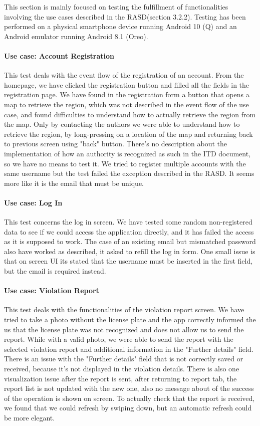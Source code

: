This section is mainly focused on testing the fulfillment of functionalities involving the use cases described in the RASD(section 3.2.2). Testing has been performed on a physical smartphone device running Android 10 (Q) and an Android emulator running Android 8.1 (Oreo).

\paragraph{Use case: Account Registration}
This test deals with the event flow of the registration of an account. From the homepage, we have clicked the registration button and filled all the fields in the registration page. We have found in the registration form a button that opens a map to retrieve the region, which was not described in the event flow of the use case, and found difficulties to understand how to actually retrieve the region from the map. Only by contacting the authors we were able to understand how to retrieve the region, by long-pressing on a location of the map and returning back to previous screen using "back" button. There's no description about the implementation of how an authority is recognized as such in the ITD document, so we have no means to test it. We tried to register multiple accounts with the same username but the test failed the exception described in the RASD. It seems more like it is the email that must be unique.
\paragraph{Use case: Log In} 
This test concerns the log in screen. We have tested some random non-registered data to see if we could access the application directly, and it has failed the access as it is supposed to work. The case of an existing email but mismatched password also have worked as described, it asked to refill the log in form. One small issue is that on screen UI its stated that the username must be inserted in the first field, but the email is required instead.
\paragraph{Use case: Violation Report} 
This test deals with the functionalities of the violation report screen. We have tried to take a photo without the license plate and the app correctly informed the us that the license plate was not recognized and does not allow us to send the report. While with a valid photo, we were able to send the report with the selected violation report and additional information in the "Further details" field.  There is an issue with the "Further details" field that is not correctly saved or received, because it's not displayed in the violation details. There is also one visualization issue after the report is sent, after returning to report tab, the report list is not updated with the new one, also no message about of the success of the operation is shown on screen. To actually check that the report is received, we found that we could refresh by swiping down, but an automatic refresh could be more elegant.

